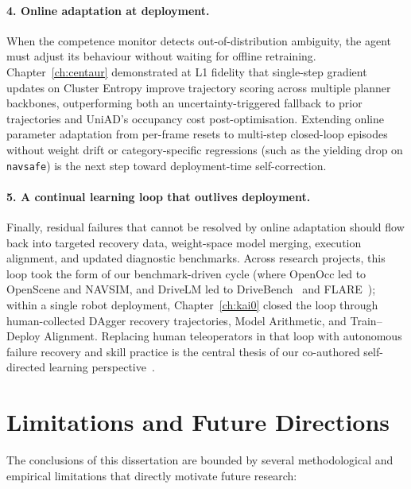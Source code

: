 \paragraph{4. Online adaptation at deployment.}
When the competence monitor detects out-of-distribution ambiguity, the agent must adjust its behaviour without waiting for offline retraining. Chapter~\ref{ch:centaur} demonstrated at L1 fidelity that single-step gradient updates on Cluster Entropy improve trajectory scoring across multiple planner backbones, outperforming both an uncertainty-triggered fallback to prior trajectories and UniAD's occupancy cost post-optimisation. Extending online parameter adaptation from per-frame resets to multi-step closed-loop episodes without weight drift or category-specific regressions (such as the yielding drop on \texttt{navsafe}) is the next step toward deployment-time self-correction.

\paragraph{5. A continual learning loop that outlives deployment.}
Finally, residual failures that cannot be resolved by online adaptation should flow back into targeted recovery data, weight-space model merging, execution alignment, and updated diagnostic benchmarks. Across research projects, this loop took the form of our benchmark-driven cycle (where OpenOcc led to OpenScene and NAVSIM, and DriveLM led to DriveBench~\cite{xie2025vlms} and FLARE~\cite{xie2026flare}); within a single robot deployment, Chapter~\ref{ch:kai0} closed the loop through human-collected DAgger recovery trajectories, Model Arithmetic, and Train--Deploy Alignment. Replacing human teleoperators in that loop with autonomous failure recovery and skill practice is the central thesis of our co-authored self-directed learning perspective~\cite{chen2025robot}.

\section{Limitations and Future Directions}\label{sec:concl:future}

The conclusions of this dissertation are bounded by several methodological and empirical limitations that directly motivate future research:

